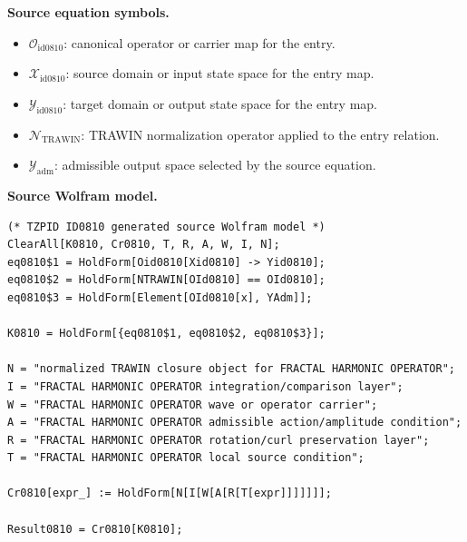 \begin{minipage}[t]{0.49\linewidth}
\begingroup
\small
\raggedright
\textbf{Source equation symbols.}\par
\begin{itemize}[leftmargin=1.35em,itemsep=1pt,topsep=1pt,parsep=0pt]
    \item $\mathcal{O}_{\mathrm{id0810}}$: canonical operator or carrier map for the entry.
    \item $\mathcal{X}_{\mathrm{id0810}}$: source domain or input state space for the entry map.
    \item $\mathcal{Y}_{\mathrm{id0810}}$: target domain or output state space for the entry map.
    \item $\mathcal{N}_{\mathrm{TRAWIN}}$: TRAWIN normalization operator applied to the entry relation.
    \item $\mathcal{Y}_{\mathrm{adm}}$: admissible output space selected by the source equation.
\end{itemize}
\endgroup
\end{minipage}\hfill
\begin{minipage}[t]{0.47\linewidth}
\begingroup
\scriptsize
\raggedright
\textbf{Source Wolfram model.}\par
\begin{Verbatim}[fontsize=\tiny,breaklines=true,breakanywhere=true]
(* TZPID ID0810 generated source Wolfram model *)
ClearAll[K0810, Cr0810, T, R, A, W, I, N];
eq0810$1 = HoldForm[Oid0810[Xid0810] -> Yid0810];
eq0810$2 = HoldForm[NTRAWIN[OId0810] == OId0810];
eq0810$3 = HoldForm[Element[OId0810[x], YAdm]];

K0810 = HoldForm[{eq0810$1, eq0810$2, eq0810$3}];

N = "normalized TRAWIN closure object for FRACTAL HARMONIC OPERATOR";
I = "FRACTAL HARMONIC OPERATOR integration/comparison layer";
W = "FRACTAL HARMONIC OPERATOR wave or operator carrier";
A = "FRACTAL HARMONIC OPERATOR admissible action/amplitude condition";
R = "FRACTAL HARMONIC OPERATOR rotation/curl preservation layer";
T = "FRACTAL HARMONIC OPERATOR local source condition";

Cr0810[expr_] := HoldForm[N[I[W[A[R[T[expr]]]]]]];

Result0810 = Cr0810[K0810];
\end{Verbatim}
\endgroup
\end{minipage}


